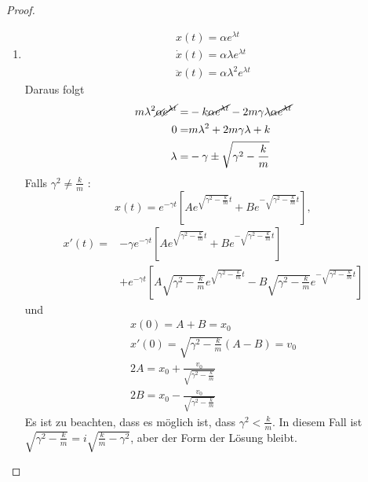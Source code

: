\begin{proof}
	\begin{enumerate}
	\item 	
	\begin{gather*}
		x(t)=\alpha e^{\lambda t}\\
		\dot{x}(t)=\alpha\lambda e^{\lambda t}\\
		\ddot{x}(t)=\alpha\lambda^2e^{\lambda t}
	\end{gather*}
Daraus folgt
\begin{align*}
	m\lambda^2\cancel\alpha\cancel{e^{\lambda t}}=&-k\cancel{\alpha e^{\lambda t}}-2m\gamma\lambda\cancel{\alpha e^{\lambda t}}\\
	0=&m\lambda^2+2m\gamma\lambda+k\\
	\lambda=&-\gamma\pm \sqrt{\gamma^2-\frac{k}{m}}
\end{align*}
Falls $\gamma^2 \neq \frac{k}{m}$ :
\[
	x(t)=e^{-\gamma t}\left[ Ae^{\sqrt{\gamma^2-\frac{k}{m}} t}+Be^{-\sqrt{\gamma^2-\frac{k}{m}} t} \right] 
,\] 
\begin{align*}
	x'(t)=&-\gamma e^{-\gamma t}\left[ Ae^{\sqrt{\gamma^2-\frac{k}{m}} t}+Be^{-\sqrt{\gamma^2-\frac{k}{m}} t} \right] \\
	      &+e^{-\gamma t}\left[ A\sqrt{\gamma^2-\frac{k}{m}} e^{\sqrt{\gamma^2-\frac{k}{m}} t}-B\sqrt{\gamma^2-\frac{k}{m}} e^{-\sqrt{\gamma^2-\frac{k}{m}} t} \right] 
\end{align*}
und
\begin{gather*}
	x(0)=A+B=x_0\\
	x'(0)=\sqrt{\gamma^2-\frac{k}{m}} \left( A-B \right)=v_0\\
	2A=x_0+\frac{v_0}{\sqrt{\gamma^2-\frac{k}{m}} }\\
	2B=x_0-\frac{v_0}{\sqrt{\gamma^2-\frac{k}{m}} }
\end{gather*}
Es ist zu beachten, dass es möglich ist, dass $\gamma^2<\frac{k}{m}$. In diesem Fall ist $\sqrt{\gamma^2-\frac{k}{m}} =i\sqrt{\frac{k}{m}-\gamma^2} $, aber der Form der L\"{o}sung bleibt.


\end{enumerate}
\end{proof}
